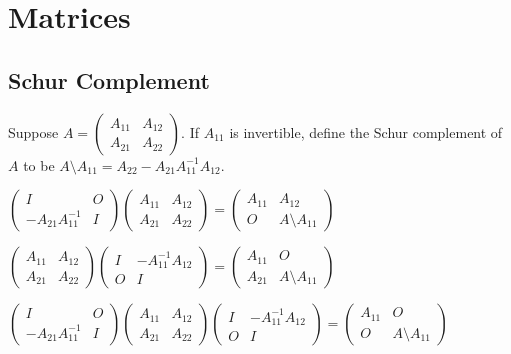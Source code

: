 \section{Matrices}

\subsection{Schur Complement}
\begin{definition}
    Suppose $A=\begin{pmatrix}
        A_{11} & A_{12}\\
         A_{21}&A_{22}
       \end{pmatrix}$. If $A_{11}$ is invertible, define the Schur complement of $A$ to be
        $A\setminus A_{11}=A_{22}-A_{21}A_{11}^{-1}A_{12}$.

\end{definition}
\begin{theorem}
    $\begin{pmatrix}
        I & O\\
        -A_{21}A_{11}^{-1} &I
       \end{pmatrix}
       \begin{pmatrix}
        A_{11} & A_{12}\\
        A_{21} & A_{22}
       \end{pmatrix}=\begin{pmatrix}
         A_{11}& A_{12}\\
        O &A\setminus A_{11}
       \end{pmatrix}$\par
       $\begin{pmatrix}
       A_{11} &A_{12} \\
       A_{21} &A_{22}
      \end{pmatrix}\begin{pmatrix}
       I & -A_{11}^{-1}A_{12}\\
       O & I
      \end{pmatrix}=\begin{pmatrix}
        A_{11}& O\\
        A_{21}& A\setminus A_{11}
      \end{pmatrix}$\par
      $\begin{pmatrix}
        I & O\\
        -A_{21}A_{11}^{-1} &I
       \end{pmatrix}\begin{pmatrix}
        A_{11} & A_{12}\\
        A_{21} & A_{22}
       \end{pmatrix}\begin{pmatrix}
        I & -A_{11}^{-1}A_{12}\\
        O & I
       \end{pmatrix}
      =\begin{pmatrix}
       A_{11} &O \\
       O &A\setminus A_{11}
      \end{pmatrix}$
\end{theorem}
